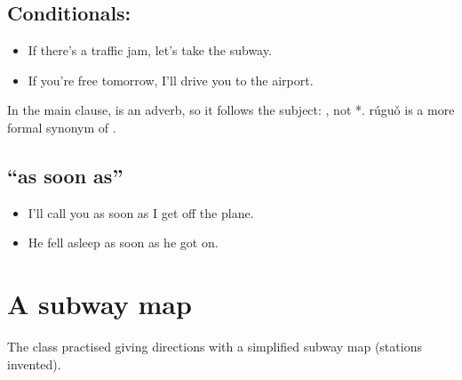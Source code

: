 \subsection{Conditionals: }

\begin{itemize}
  \item {} If there's a traffic jam, let's take the subway.
  \item {} If you're free tomorrow, I'll drive
        you to the airport.
\end{itemize}

\begin{important}
In the main clause,  is an adverb, so it follows the subject:
, not *.  rúguǒ is a more formal synonym of
.
\end{important}

\subsection{ ``as soon as''}

\begin{itemize}
  \item {} I'll call you as soon as I get off the plane.
  \item {} He fell asleep as soon as he got on.
\end{itemize}

\section{A subway map}

The class practised giving directions with a simplified subway map (stations
invented).

